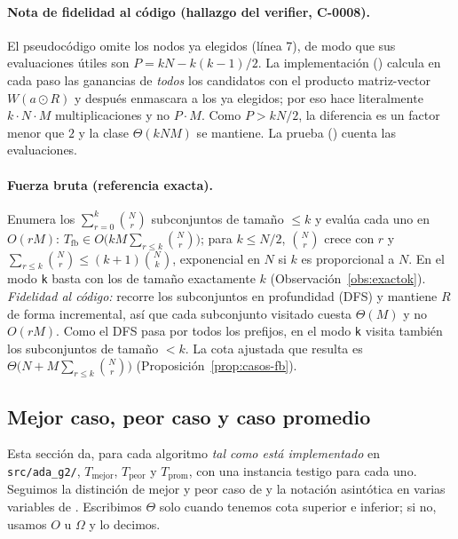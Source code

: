 \paragraph{Nota de fidelidad al código (hallazgo del verifier, C-0008).} El pseudocódigo omite los nodos ya elegidos (línea 7), de modo que sus evaluaciones útiles son $P=kN-k(k-1)/2$. La implementación () calcula en cada paso las ganancias de \emph{todos} los candidatos con el producto matriz-vector $W(a\odot R)$ y después enmascara a los ya elegidos; por eso hace literalmente $k\cdot N\cdot M$ multiplicaciones y no $P\cdot M$. Como $P>kN/2$, la diferencia es un factor menor que $2$ y la clase $\Theta(kNM)$ se mantiene. La prueba  () cuenta las evaluaciones.

\paragraph{Fuerza bruta (referencia exacta).} Enumera los $\sum_{r=0}^{k}\binom{N}{r}$ subconjuntos de tamaño $\le k$ y evalúa cada uno en $O(rM)$: $T_{\text{fb}}\in O\bigl(kM\sum_{r\le k}\binom{N}{r}\bigr)$; para $k\le N/2$, $\binom{N}{r}$ crece con $r$ y $\sum_{r\le k}\binom{N}{r}\le(k+1)\binom{N}{k}$, exponencial en $N$ si $k$ es proporcional a $N$. En el modo \texttt{k} basta con los de tamaño exactamente $k$ (Observación~\ref{obs:exactok}). \emph{Fidelidad al código:}  recorre los subconjuntos en profundidad (DFS) y mantiene $R$ de forma incremental, así que cada subconjunto visitado cuesta $\Theta(M)$ y no $O(rM)$. Como el DFS pasa por todos los prefijos, en el modo \texttt{k} visita también los subconjuntos de tamaño $<k$. La cota ajustada que resulta es $\Theta\bigl(N+M\sum_{r\le k}\binom{N}{r}\bigr)$ (Proposición~\ref{prop:casos-fb}).

\subsection{Mejor caso, peor caso y caso promedio}\label{sec:casos}

Esta sección da, para cada algoritmo \emph{tal como está implementado} en \texttt{src/ada\_g2/}, $T_{\text{mejor}}$, $T_{\text{peor}}$ y $T_{\text{prom}}$, con una instancia testigo para cada uno. Seguimos la distinción de mejor y peor caso de \cite[§2.1.1]{notas} y la notación asintótica en varias variables de \cite[cap.~1]{notas}. Escribimos $\Theta$ solo cuando tenemos cota superior e inferior; si no, usamos $O$ u $\Omega$ y lo decimos.

